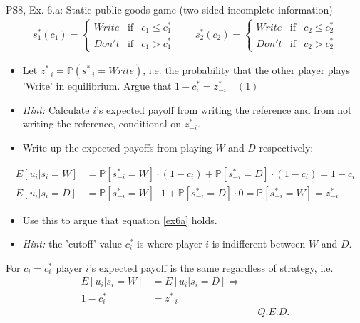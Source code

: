 \begin{frame}{PS8, Ex. 6.a: Static public goods game (two-sided incomplete information)}
    \begin{align*}
      s_1^*(c_1)=\left\{\begin{array}{rcl}
        Write & \text{if} & c_1\leq c_1^*\\
        Don't & \text{if} & c_1>c_1^*
        \end{array}\right.\quad\quad
      s_2^*(c_2)=\left\{\begin{array}{rcl}
        Write & \text{if} & c_2\leq c_2^*\\
        Don't & \text{if} & c_2>c_2^*
        \end{array}\right.
    \end{align*}
    \vspace{-12pt}
    \begin{itemize}
      \item[(a)] Let $z_{-i}^* = \mathbb{P}(s_{-i}^*=Write)$, i.e. the probability that the other player plays 'Write' in equilibrium. Argue that $1-c_i^*=z_{-i}^*\quad(1)$
      \item[] \textit{Hint:} Calculate $i$'s expected payoff from writing the reference and from not writing the reference, conditional on $z_{-i}^*$.
    \end{itemize}
    \vspace{-8pt}
    \begin{itemize}
      \item[Step 1:] Write up the expected payoffs from playing $W$ and $D$ respectively:
    \end{itemize}
    \vspace{-8pt}
    \begin{align*}
      E[u_i|s_i=W]&=\mathbb{P}\left[s_{-i}^*=W\right]\cdot(1-c_i)+\mathbb{P}\left[s_{-i}^*=D\right]\cdot(1-c_i)=1-c_i\\
      E[u_i|s_i=D]&=\mathbb{P}\left[s_{-i}^*=W\right]\cdot1+\mathbb{P}\left[s_{-i}^*=D\right]\cdot0=\mathbb{P}\left[s_{-i}^*=W\right]=z_{-i}^*
    \end{align*}
    \vspace{-16pt}
    \begin{itemize}
      \item[Step 2:] Use this to argue that equation \eqref{ex6a} holds.
      \item[]        \textit{Hint:} the 'cutoff' value $c_i^*$ is where player $i$ is indifferent between $W$ and $D$.
    \end{itemize}
    For $c_i=c_i^*$ player $i$'s expected payoff is the same regardless of strategy, i.e.
    \begin{align*}
      E[u_i|s_i=W]&=E[u_i|s_i=D]\Rightarrow\\
      1-c_i^*&=z_{-i}^*\\
      & && Q.E.D.
    \end{align*}
    \vfill\null
\end{frame}



